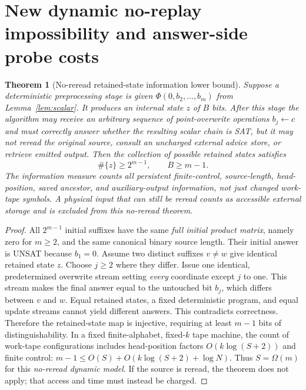 \documentclass[11pt]{article}
\newtheorem{theorem}{Theorem}
\begin{document}
\section{New dynamic no-replay impossibility and answer-side probe costs}
\begin{theorem}[No-reread retained-state information lower bound]\label{thm:memory}
Suppose a deterministic preprocessing stage is given $\Phi(0,b_2,\ldots,b_m)$ from Lemma~\ref{lem:scalar}. It produces an internal state $z$ of $B$ bits. After this stage the algorithm may receive an arbitrary sequence of \emph{point-overwrite operations} $b_j\gets c$ and must correctly answer whether the resulting scalar chain is SAT, but it may not reread the original source, consult an uncharged external advice store, or retrieve emitted output. Then the collection of possible retained states satisfies
\[
\#\{z\}\ge2^{m-1},\qquad\boxed{B\ge m-1}.
\]
The information measure counts all persistent finite-control, source-length, head-position, saved ancestor, and auxiliary-output information, not just changed work-tape symbols. A physical input that can still be reread counts as accessible external storage and is excluded from this no-reread theorem.
\end{theorem}
\begin{proof}
All $2^{m-1}$ initial suffixes have the same \emph{full initial product matrix}, namely zero for $m\ge2$, and the same canonical binary source length. Their initial answer is UNSAT because $b_1=0$. Assume two distinct suffixes $v\ne w$ give identical retained state $z$. Choose $j\ge2$ where they differ. Issue one identical, predetermined overwrite stream setting \emph{every} coordinate except $j$ to one. This stream makes the final answer equal to the untouched bit $b_j$, which differs between $v$ and $w$. Equal retained states, a fixed deterministic program, and equal update streams cannot yield different answers. This contradicts correctness. Therefore the retained-state map is injective, requiring at least $m-1$ bits of distinguishability. In a fixed finite-alphabet, fixed-$k$ tape machine, the count of work-tape configurations includes head-position factors $O(k\log(S+2))$ and finite control: $m-1\le O(S)+O(k\log(S+2)+\log N)$. Thus $S=\Omega(m)$ for this \emph{no-reread dynamic model}. If the source is reread, the theorem does not apply; that access and time must instead be charged.
\end{proof}
\end{document}
